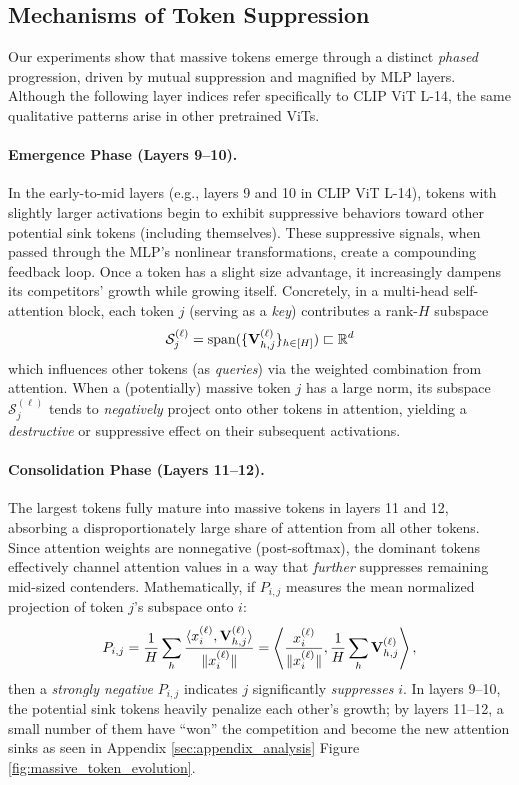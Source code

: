 \documentclass[10pt,twocolumn,letterpaper]{article}
\begin{document}
\subsection{Mechanisms of Token Suppression}

Our experiments show that massive tokens emerge through a distinct \emph{phased} progression, driven by mutual suppression and magnified by MLP layers. Although the following layer indices refer specifically to CLIP ViT L-14, the same qualitative patterns arise in other pretrained ViTs.

\paragraph{Emergence Phase (Layers 9--10).}
In the early-to-mid layers (e.g., layers 9 and 10 in CLIP ViT L-14), tokens with slightly larger activations begin to exhibit suppressive behaviors toward other potential sink tokens (including themselves). These suppressive signals, when passed through the MLP’s nonlinear transformations, create a compounding feedback loop. Once a token has a slight size advantage, it increasingly dampens its competitors’ growth while growing itself. Concretely, in a multi-head self-attention block, each token $j$ (serving as a \emph{key}) contributes a rank-$H$ subspace
\begin{align}
    \mathcal{S}^{(\ell)}_j = \text{span}(\{\mbox{{\bfseries V}}^{(\ell)}_{h, j}\}_{h \in [H]}) \sqsubset \mathbb{R}^d
\end{align}
which influences other tokens (as \emph{queries}) via the weighted combination from attention. When a (potentially) massive token $j$ has a large norm, its subspace $\mathcal{S}_j^{(\ell)}$ tends to \emph{negatively} project onto other tokens in attention, yielding a \emph{destructive} or suppressive effect on their subsequent activations.


\paragraph{Consolidation Phase (Layers 11--12).} 
The largest tokens fully mature into massive tokens in layers 11 and 12, absorbing a disproportionately large share of attention from all other tokens. Since attention weights are nonnegative (post-softmax), the dominant tokens effectively channel attention values in a way that \emph{further} suppresses remaining mid-sized contenders. Mathematically, if $P_{i,j}$ measures the mean normalized projection of token $j$’s subspace onto $i$:
\begin{align}
    P_{i, j}
    = \frac{1}{H} \sum_{h}^{} \frac{\langle x^{(\ell)}_{i}, \mbox{{\bfseries V}}^{(\ell)}_{h, j} \rangle}{\lVert x^{(\ell)}_{i} \rVert}
    = \left\langle \frac{x^{(\ell)}_{i}}{\lVert x^{(\ell)}_{i} \rVert}, \frac{1}{H} \sum_{h}^{} \mbox{{\bfseries V}}^{(\ell)}_{h, j} \right\rangle,
\end{align}
then a \emph{strongly negative} $P_{i,j}$ indicates $j$ significantly \emph{suppresses} $i$. In layers 9--10, the potential sink tokens heavily penalize each other’s growth; by layers 11--12, a small number of them have ``won'' the competition and become the new attention sinks as seen in Appendix \ref{sec:appendix_analysis} Figure \ref{fig:massive_token_evolution}.
\end{document}
